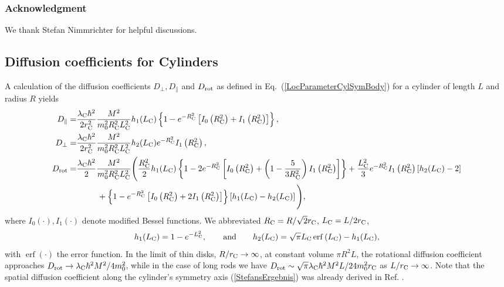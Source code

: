 \documentclass[%
 twocolumn,
 amsmath,amssymb,
 aps,
 pra,
]{revtex4-1}
\DeclareMathOperator\erf{erf}
\begin{document}
\subsubsection*{Acknowledgment}
We thank Stefan Nimmrichter for helpful discussions.

\appendix


\begin{widetext}
\section{Diffusion coefficients for Cylinders} 
A calculation of the diffusion coefficients $D_{\perp},D_{\parallel}$ and $D_{\rm rot}$ as defined in Eq.~(\ref{LocParameterCylSymBody}) for a cylinder of length $L$ and radius $R$ yields
\begin{subequations}
\begin{align}
D_{\parallel}=&\frac{\lambda_{\rm C}\hbar^2}{2r_{\rm C}^2}\frac{M^2}{m_0^2R_{\rm C}^2L_{\rm C}^2}h_1(L_{\rm C})\left\{
1-e^{-R_{\rm C}^2}\left[I_0\left(R_{\rm C}^2\right)+I_1\left(R_{\rm C}^2\right)\right]
\right\},\label{StefansErgebnis}\\
D_{\perp}=&\frac{\lambda_{\rm C}\hbar^2}{2r_{\rm C}^2}\frac{M^2}{m_0^2R_{\rm C}^2L_{\rm C}^2}h_2(L_{\rm C}) e^{-R_{\rm C}^2}I_1\left(R_{\rm C}^2\right),\\
D_{\rm rot}=&\frac{\lambda_{\rm C}\hbar^2}{2}\frac{M^2}{m_0^2 R_{\rm C}^2 L_{\rm C}^2}\Bigg(
\frac{R_{\rm C}^2}{2} h_1(L_{\rm C})\left\{ 1 - 2 e^{-R_{\rm C}^2}\left[I_0\left(R_{\rm C}^2\right) + 
\left(1 - \frac{5}{3R_{\rm C}^2}\right)I_1\left(R_{\rm C}^2\right)
\right]\right\}+\frac{L_{\rm C}^2}{3}e^{-R_{\rm C}^2} I_1\left(R_{\rm C}^2\right)\left[
h_2(L_{\rm C})-2
\right]\nonumber\\
&\hspace{9mm}+\left\{
1-e^{-R_{\rm C}^2}\left[I_0\left(R_{\rm C}^2\right)+2I_1\left(R_{\rm C}^2\right)\right]
\right\}\left[h_1(L_{\rm C})-h_2(L_{\rm C})
\right]
\Bigg),
\label{betaPhiCylinder}
\end{align}
\end{subequations}
where $I_0(\cdot),I_1(\cdot)$ denote modified Bessel functions. We abbreviated $R_{\rm C}=R/\sqrt{2}r_{\rm C}$, $L_{\rm C}=L/2r_{\rm C}$,
\begin{equation}
h_1(L_{\rm C}) = 1-e^{-L_{\rm C}^2}, \qquad \text{and} \qquad h_2(L_{\rm C}) =\sqrt{\pi} L_{\rm C}\erf\left(L_{\rm C}\right) - h_1(L_{\rm C}),
\end{equation}
with $\erf(\cdot)$ the error function. In the limit of thin disks, $R / r_{\rm C} \to \infty$, at constant volume $\pi R^2 L$, the rotational diffusion coefficient approaches $D_{\rm rot} \to \lambda_{\rm C}\hbar^2M^2/4m_0^2$, while in the case of long rods we have  $D_{\rm rot} \sim \sqrt{\pi} \lambda_{\rm C}\hbar^2M^2 L/24 m_0^2 r_{\rm C}$ as  $L / r_{\rm C} \to \infty$. Note that the spatial diffusion coefficient along the cylinder's symmetry axis (\ref{StefansErgebnis}) was already derived in Ref. \cite{nimmrichter2014optomechanical}.
\end{widetext}
\end{document}
